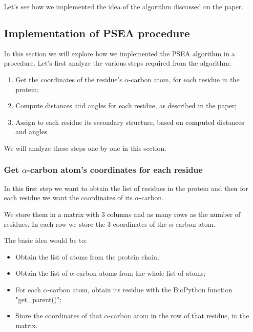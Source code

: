 Let's see how we implemented the idea of the algorithm discussed on the paper\cite{psea}.

\pagebreak

\subsection{Implementation of PSEA procedure}
In this section we will explore how we implemented the PSEA algorithm in a procedure.
Let's first analyze the various steps required from the algorithm:
\begin{enumerate}
    \item Get the coordinates of the residue's $\alpha$-carbon atom, for each residue in the protein;
    \item Compute distances and angles for each residue, as described in the paper;
    \item Assign to each residue its secondary structure, based on computed distances and angles.
\end{enumerate}
We will analyze these steps one by one in this section.

\subsubsection{Get $\alpha$-carbon atom's coordinates for each residue}
In this first step we want to obtain the list of residues in the protein and then for each residue we want the coordinates of its $\alpha$-carbon.

We store them in a matrix with 3 columns and as many rows as the number of residues. In each row we store the 3 coordinates of the $\alpha$-carbon atom.

The basic idea would be to:
\begin{itemize}
    \item Obtain the list of atoms from the protein chain; 
    \item Obtain the list of $\alpha$-carbon atoms from the whole list of atoms;
    \item For each $\alpha$-carbon atom, obtain its residue with the BioPython function "get\_parent()";
    \item Store the coordinates of that $\alpha$-carbon atom in the row of that residue, in the matrix.
\end{itemize}

